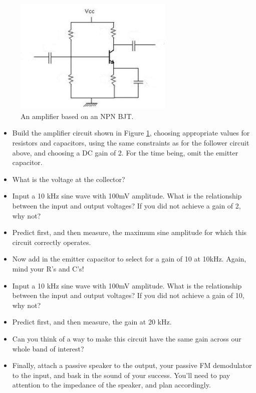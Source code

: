 \documentclass[11pt]{article}
\begin{document}
\begin{figure}[h!]\centering
\includegraphics[width=3in]{analog_lab_2_plots/bjt_amplifier_lab2.png}
\caption{An amplifier based on an NPN BJT.}
\label{fig:amplifier}
\end{figure}

\begin{itemize}
\item Build the amplifier circuit shown in Figure \ref{fig:amplifier}, choosing appropriate values for
resistors and capacitors, using the same constraints as for the follower circuit above, and choosing a
DC gain of 2.  For the time being, omit the emitter capacitor.
\item What is the voltage at the collector?
\item Input a 10 kHz sine wave with 100mV amplitude.  What is the relationship between the 
input and output voltages?  If you did not achieve a gain of 2, why not?
\item Predict first, and then measure, the maximum sine amplitude for which this circuit correctly operates.
\item Now add in the emitter capacitor to select for a gain of 10 at 10kHz.  Again, mind your R's and C's!
\item Input a 10 kHz sine wave with 100mV amplitude.  What is the relationship between the 
input and output voltages?  If you did not achieve a gain of 10, why not?
\item Predict first, and then measure, the gain at 20 kHz.
\item Can you think of a way to make this circuit have the same gain across our whole band of interest?
\item Finally, attach a passive speaker to the output, your passive FM demodulator to the input, and bask in
the sound of your success.  You'll need to pay attention to the impedance of the speaker, and plan accordingly.
\end{itemize}
\end{document}
